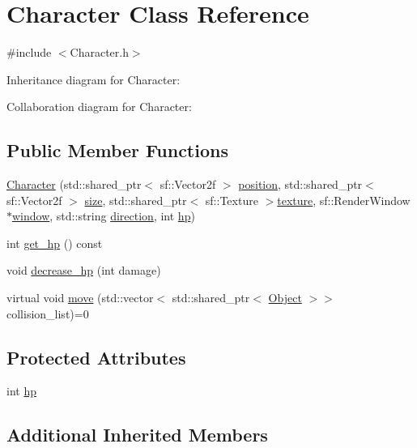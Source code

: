 \hypertarget{classCharacter}{}\section{Character Class Reference}
\label{classCharacter}


{\ttfamily \#include $<$Character.\+h$>$}



Inheritance diagram for Character\+:


Collaboration diagram for Character\+:
\subsection*{Public Member Functions}
\begin{DoxyCompactItemize}
\item 
\hyperlink{classCharacter_a756e9c6ac793958b9028808abdbee2bd}{Character} (std\+::shared\+\_\+ptr$<$ sf\+::\+Vector2f $>$ \hyperlink{classObject_a8b1724482fb412feb64a638038161b7a}{position}, std\+::shared\+\_\+ptr$<$ sf\+::\+Vector2f $>$ \hyperlink{classObject_ac8bfde5d0428d9c091854fe1a09b7d9f}{size}, std\+::shared\+\_\+ptr$<$ sf\+::\+Texture $>$\hyperlink{classObject_a8ff6491b841d0f48da3d98041fbca934}{texture}, sf\+::\+Render\+Window $\ast$\hyperlink{classObject_a5c6cfc086ea1e39e0b3cf8633a763bf8}{window}, std\+::string \hyperlink{classMovable__Obj_a4f4eb3171656831c1f0b8dbab2b2a00c}{direction}, int \hyperlink{classCharacter_a273353643988a87a0ce03cff3870b2d9}{hp})
\item 
int \hyperlink{classCharacter_a2505da59bef541d2224af270010d03b5}{get\+\_\+hp} () const
\item 
void \hyperlink{classCharacter_aeda14114ec98feafd872b9b9b8e0644c}{decrease\+\_\+hp} (int damage)
\item 
virtual void \hyperlink{classCharacter_a91211cae08aab6a74b43377e4463283a}{move} (std\+::vector$<$ std\+::shared\+\_\+ptr$<$ \hyperlink{classObject}{Object} $>$$>$ collision\+\_\+list)=0
\end{DoxyCompactItemize}
\subsection*{Protected Attributes}
\begin{DoxyCompactItemize}
\item 
int \hyperlink{classCharacter_a273353643988a87a0ce03cff3870b2d9}{hp}
\end{DoxyCompactItemize}
\subsection*{Additional Inherited Members}


